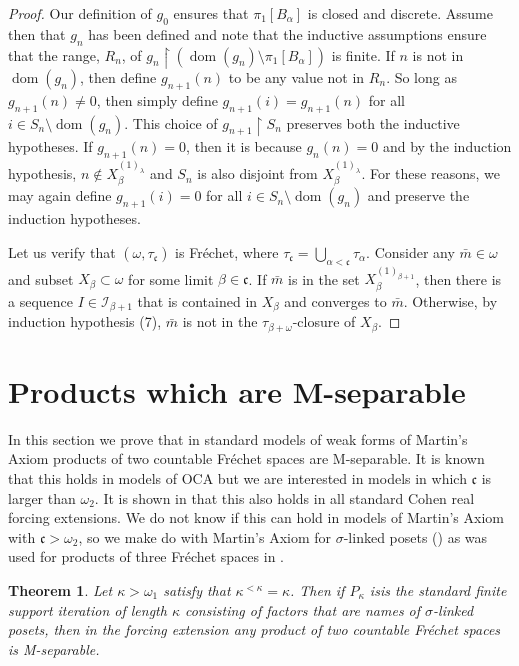 \documentclass{amsart}
\newtheorem{theorem}[thm]{Theorem}
\theoremstyle{definition}
\theoremstyle{remark}
\def\dom{\operatorname{dom}}
\begin{document}
\begin{proof}
Our definition of $g_0$ ensures that $\pi_1[B_\alpha]$ is closed
and discrete.    Assume then that
$g_n$ has been defined and note that the inductive assumptions
ensure that the range, $R_n$, of $g_n\restriction (\dom(g_n)\setminus \pi_1[B_\alpha])$ 
is finite. If $n$ is not in $\dom(g_n)$, then define $g_{n+1}(n)$ to be
any value not in $R_n$.  So long as $g_{n+1}(n)\neq 0$,
then simply    
define $g_{n+1}(i)=g_{n+1}(n)$ for all $i\in S_n\setminus
\dom(g_n)$.  
This choice of $g_{n+1}\restriction S_n$ preserves both the inductive
hypotheses.  
If $g_{n+1}(n)=0$, then it is because $g_n(n)=0$
and by the induction hypothesis, $n\notin X_\beta^{(1)_\lambda}$
and $S_n$ is also disjoint from $X_\beta^{(1)_\lambda}$.
For these reasons,  we may again define $g_{n+1}(i)=0$
for all $i\in S_{n}\setminus \dom(g_n)$ and preserve
the induction hypotheses.
\medskip

Let us verify that $(\omega, \tau_{\mathfrak c})$ is Fr\'echet,
where $\tau_{\mathfrak c} = \bigcup_{\alpha<\mathfrak c} \tau_\alpha$.
Consider any $\bar m\in\omega$ and subset $X_\beta\subset\omega$
for some limit $\beta\in\mathfrak c$. If $\bar m$ is 
in the set $X_\beta^{(1)_{\beta+1}}$, then there is a sequence
 $I\in \mathcal I_{\beta+1}$ that is contained in $X_\beta$
 and converges to $\bar m$. Otherwise,  by induction
 hypothesis (7), $\bar m$ is not in the $\tau_{\beta+\omega}$-closure
 of $X_\beta$. 
\end{proof}
 
\section{Products which are M-separable}

In this section we prove that in standard models of weak forms of Martin's Axiom
 products of two countable Fr\'echet spaces are M-separable. 
  It is known that this holds in models of OCA but we are interested
  in models in which $\mathfrak c$ is larger than $\omega_2$. It is
  shown in \cite{BaDo2} that this also holds
  in all standard Cohen real forcing extensions. We do not know
  if this can hold in models of Martin's Axiom with $\mathfrak c>\omega_2$,
   so we make do with 
   Martin's Axiom for $\sigma$-linked posets (\cite{AvTo11})
   as was used for products of three Fr\'echet spaces in \cite{MA3}.

\begin{theorem}  Let $\kappa>\omega_1$ satisfy that $\kappa^{<\kappa}=\kappa$.
Then if   $P_\kappa$ is\label{second}  is the standard finite
support iteration of length $\kappa$  consisting of factors
that are names of  $\sigma$-linked posets, then in the forcing
extension any product of two countable Fr\'echet spaces is M-separable.
\end{theorem}
\end{document}
